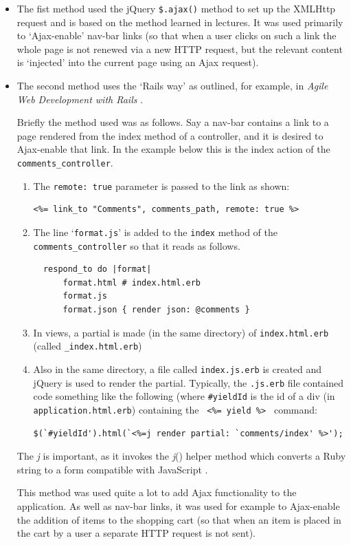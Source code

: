 \documentclass[11pt]{article}
\begin{document}
\begin{itemize}[itemsep=1ex,leftmargin=1cm,rightmargin=1cm]
\item[] The fist method used the jQuery  \verb|$.ajax()| method to set up the XMLHttp request and
is based on the method learned in lectures. It was used primarily to `Ajax-enable' nav-bar links
(so that when a user clicks on such a link the whole page is not renewed via a new HTTP request,
but the relevant content is `injected' into the current page using an Ajax request). 
\item[] The second method uses the `Rails way' as outlined, for example, in \textit{Agile Web Development with Rails} \cite[pp 136 - 139]{agile2012}.

Briefly the method used was as follows. 
Say a nav-bar contains a link to a page rendered from the index method of a controller,
and it is desired to Ajax-enable that link. In the example below this is the index action of the
\verb|comments_controller|.  
\begin{enumerate}
\item The \verb|remote: true| parameter is passed to the link as shown:
\begin{verbatim}
<%= link_to "Comments", comments_path, remote: true %>
\end{verbatim}
\item The line `\verb|format.js|' is added to the \verb|index| method of the \verb|comments_controller| so that it
reads as follows.
\begin{verbatim}
  respond_to do |format|
      format.html # index.html.erb
      format.js
      format.json { render json: @comments }
\end{verbatim}
\item In views, a  partial is made (in the same directory) of \verb|index.html.erb| (called \verb|_index.html.erb|)
\item Also in the same directory, a file called \verb|index.js.erb| 
is created and jQuery is used to render the partial. Typically, the \verb|.js.erb| 
file contained code something like the following (where \verb|#yieldId| is the id of a div (in \verb|application.html.erb|) 
containing the \verb| <%= yield %> | command:
\begin{verbatim}
$(`#yieldId').html(`<%=j render partial: `comments/index' %>');
\end{verbatim}  

\end{enumerate} 
The \textit{j} is important, as it invokes the \textit{j}() helper method which converts a Ruby string to a form
compatible with JavaScript \citep[p 138] {agile2012}.
 
This method was used quite a lot to add Ajax functionality to the application.  
As well as nav-bar links, it was used for example to Ajax-enable 
the addition of items to the shopping cart (so that when an item is placed in the cart by a user a separate
HTTP request is not sent).
\end{itemize}
\end{document}

